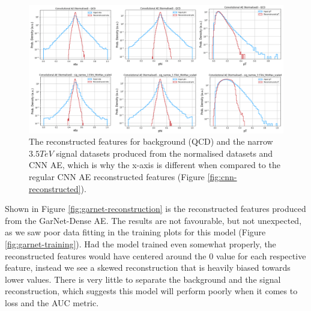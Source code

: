 \documentclass[a4paper]{article}
\theoremstyle{plain}
\theoremstyle{definition}
\begin{document}
            \begin{figure}[H]
                \centering
                \begin{minipage}[b]{\linewidth}
                    \centering
                    \includegraphics[width=\textwidth]{cnn-norm.png}
                    \caption{The reconstructed features for background (QCD) and the narrow $3.5 TeV$ signal datasets produced from the normalised datasets and CNN AE, which is why the x-axis is different when compared to the regular CNN AE reconstructed features (Figure \ref{fig:cnn-reconstructed}).}
                    \label{fig:cnn-recontructed-norm}
                \end{minipage}
            \end{figure}

            Shown in Figure \ref{fig:garnet-reconstruction} is the reconstructed features produced from the GarNet-Dense AE. The results are not favourable, but not unexpected, as we saw poor data fitting in the training plots for this model (Figure \ref{fig:garnet-training}). Had the model trained even somewhat properly, the reconstructed features would have centered around the 0 value for each respective feature, instead we see a skewed reconstruction that is heavily biased towards lower values. There is very little to separate the background and the signal reconstruction, which suggests this model will perform poorly when it comes to loss and the AUC metric. 
\end{document}
